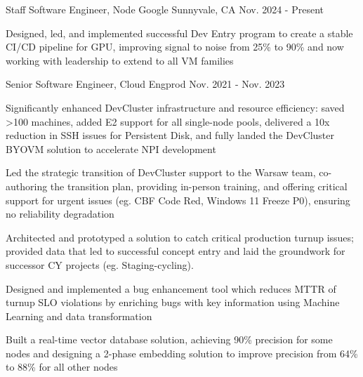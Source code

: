 \begin{cventries}
  \cventry
    {Staff Software Engineer, Node} %
    {Google} %
    {Sunnyvale, CA} %
    {Nov. 2024 - Present} %
    {
      \begin{cvitems} %
        \item {Designed, led, and implemented successful Dev Entry program to create a stable CI/CD pipeline for GPU, improving signal to noise from 25\% to 90\% and now working with leadership to extend to all VM families}
      \end{cvitems}
    }

  \cventry
    {Senior Software Engineer, Cloud Engprod} %
    {} %
    {} %
    {Nov. 2021 - Nov. 2023} %
    {
      \begin{cvitems} %
        \item {Significantly enhanced DevCluster infrastructure and resource efficiency: saved >100 machines, added E2 support for all single-node pools, delivered a 10x reduction in SSH issues for Persistent Disk, and fully landed the DevCluster BYOVM solution to accelerate NPI development}
        \item {Led the strategic transition of DevCluster support to the Warsaw team, co-authoring the transition plan, providing in-person training, and offering critical support for urgent issues (eg. CBF Code Red, Windows 11 Freeze P0), ensuring no reliability degradation}
        \item {Architected and prototyped a solution to catch critical production turnup issues; provided data that led to successful concept entry and laid the groundwork for successor CY projects (eg. Staging-cycling).}
        \item {Designed and implemented a bug enhancement tool which reduces MTTR of turnup SLO violations by enriching bugs with key information using Machine Learning and data transformation}
        \item {Built a real-time vector database solution, achieving 90\% precision for some nodes and designing a 2-phase embedding solution to improve precision from 64\% to 88\% for all other nodes}
      \end{cvitems}
    }


\end{cventries}
